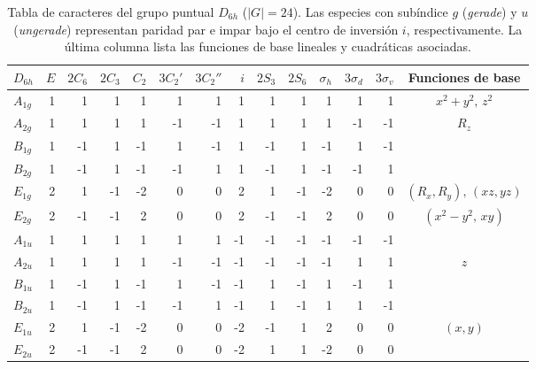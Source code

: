 \begin{table}[t]
\caption{\label{tab:d6h}Tabla de caracteres del grupo puntual $D_{6h}$ ($|G|=24$). Las especies con subíndice $g$ (\emph{gerade}) y $u$ (\emph{ungerade}) representan paridad par e impar bajo el centro de inversión $i$, respectivamente. La última columna lista las funciones de base lineales y cuadráticas asociadas.}
\begin{ruledtabular}
\begin{tabular}{lrrrrrrrrrrrrc}
$D_{6h}$ & $E$ & $2C_6$ & $2C_3$ & $C_2$ & $3C_2'$ & $3C_2''$ & $i$ & $2S_3$ & $2S_6$ & $\sigma_h$ & $3\sigma_d$ & $3\sigma_v$ & Funciones de base \\
\hline
$A_{1g}$ & 1 &  1 &  1 &  1 &  1 &  1 &  1 &  1 &  1 &  1 &  1 &  1 & $x^2+y^2,\, z^2$ \\
$A_{2g}$ & 1 &  1 &  1 &  1 & -1 & -1 &  1 &  1 &  1 &  1 & -1 & -1 & $R_z$ \\
$B_{1g}$ & 1 & -1 &  1 & -1 &  1 & -1 &  1 & -1 &  1 & -1 &  1 & -1 & \\
$B_{2g}$ & 1 & -1 &  1 & -1 & -1 &  1 &  1 & -1 &  1 & -1 & -1 &  1 & \\
$E_{1g}$ & 2 &  1 & -1 & -2 &  0 &  0 &  2 &  1 & -1 & -2 &  0 &  0 & $(R_x, R_y),\, (xz, yz)$ \\
$E_{2g}$ & 2 & -1 & -1 &  2 &  0 &  0 &  2 & -1 & -1 &  2 &  0 &  0 & $(x^2-y^2,\, xy)$ \\
$A_{1u}$ & 1 &  1 &  1 &  1 &  1 &  1 & -1 & -1 & -1 & -1 & -1 & -1 & \\
$A_{2u}$ & 1 &  1 &  1 &  1 & -1 & -1 & -1 & -1 & -1 & -1 &  1 &  1 & $z$ \\
$B_{1u}$ & 1 & -1 &  1 & -1 &  1 & -1 & -1 &  1 & -1 &  1 & -1 &  1 & \\
$B_{2u}$ & 1 & -1 &  1 & -1 & -1 &  1 & -1 &  1 & -1 &  1 &  1 & -1 & \\
$E_{1u}$ & 2 &  1 & -1 & -2 &  0 &  0 & -2 & -1 &  1 &  2 &  0 &  0 & $(x, y)$ \\
$E_{2u}$ & 2 & -1 & -1 &  2 &  0 &  0 & -2 &  1 &  1 & -2 &  0 &  0 & \\
\end{tabular}
\end{ruledtabular}
\end{table}

